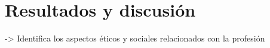 
\chapter{Resultados y discusión}
\label{cha:ResultadosyDiscusion}

    -> Identifica los aspectos éticos y sociales relacionados con la profesión


\newpage
